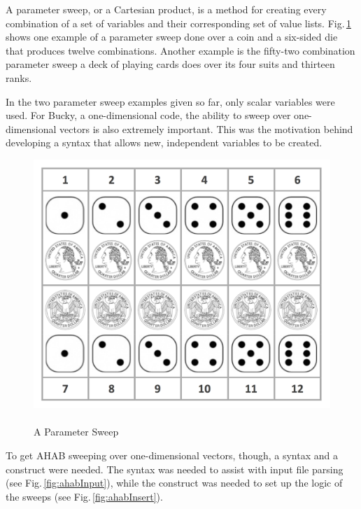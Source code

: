 A parameter sweep, or a Cartesian product, is a method for creating every combination of a set of variables and their corresponding set of value lists.  Fig.\,\ref{fig:parameterSweep} shows one example of a parameter sweep done over a coin and a six-sided die that produces twelve combinations.  Another example is the fifty-two combination parameter sweep a deck of playing cards does over its four suits and thirteen ranks.

In the two parameter sweep examples given so far, only scalar variables were used.  For Bucky, a one-dimensional code, the ability to sweep over one-dimensional vectors is also extremely important.  This was the motivation behind developing a syntax that allows new, independent variables to be created.

\begin{figure}	
	\centering
	\includegraphics[width=.75\textwidth]{graphics/parameterSweep.png}
	\caption[A Scalar Parameter Sweep]{ \\ A Parameter Sweep \\  }
	\label{fig:parameterSweep}
\end{figure}

To get AHAB sweeping over one-dimensional vectors, though, a syntax and a construct were needed.  The syntax was needed to assist with input file parsing (see Fig.\,\ref{fig:ahabInput}), while the construct was needed to set up the logic of the sweeps (see Fig.\,\ref{fig:ahabInsert}).

